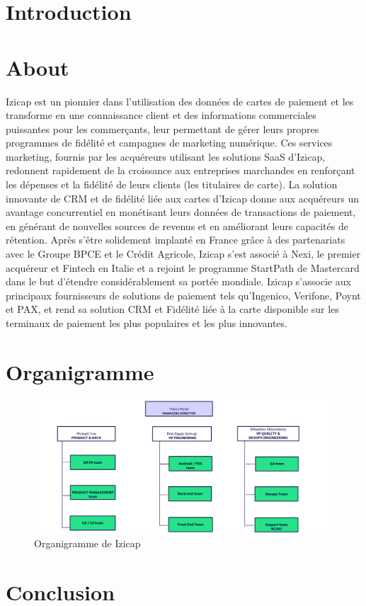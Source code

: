 
\section*{Introduction}

\section{About}
Izicap est un pionnier dans l'utilisation des données de cartes de paiement et les transforme en une connaissance client et des informations commerciales puissantes pour les commerçants, leur permettant de gérer leurs propres programmes de fidélité et campagnes de marketing numérique. 
Ces services marketing, fournis par les acquéreurs utilisant les solutions SaaS d'Izicap, redonnent rapidement de la croissance aux entreprises marchandes en renforçant les dépenses et la fidélité de leurs clients (les titulaires de carte). 
La solution innovante de CRM et de fidélité liée aux cartes d'Izicap donne aux acquéreurs un avantage concurrentiel en monétisant leurs données de transactions de paiement, en générant de nouvelles sources de revenus et en améliorant leurs capacités de rétention.
Après s'être solidement implanté en France grâce à des partenariats avec le Groupe BPCE et le Crédit Agricole, Izicap s'est associé à Nexi, le premier acquéreur et Fintech en Italie et a rejoint le programme StartPath de Mastercard dans le but d'étendre considérablement sa portée mondiale. 
Izicap s'associe aux principaux fournisseurs de solutions de paiement tels qu'Ingenico, Verifone, Poynt et PAX, et rend sa solution CRM et Fidélité liée à la carte disponible sur les terminaux de paiement les plus populaires et les plus innovantes.

\section{Organigramme}
\begin{figure}[H]
\centering
\includegraphics[width=\linewidth]{images/orga.png}
\caption{Organigramme de Izicap}\label{fig:organigmramme}
\end{figure}

\section*{Conclusion}
